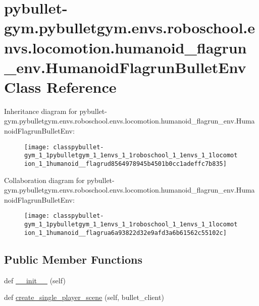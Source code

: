\hypertarget{classpybullet-gym_1_1pybulletgym_1_1envs_1_1roboschool_1_1envs_1_1locomotion_1_1humanoid__flagru3f2c7cfb3b7b479419ab25a1807bf084}{}\section{pybullet-\/gym.pybulletgym.\+envs.\+roboschool.\+envs.\+locomotion.\+humanoid\+\_\+flagrun\+\_\+env.\+Humanoid\+Flagrun\+Bullet\+Env Class Reference}
\label{classpybullet-gym_1_1pybulletgym_1_1envs_1_1roboschool_1_1envs_1_1locomotion_1_1humanoid__flagru3f2c7cfb3b7b479419ab25a1807bf084}


Inheritance diagram for pybullet-\/gym.pybulletgym.\+envs.\+roboschool.\+envs.\+locomotion.\+humanoid\+\_\+flagrun\+\_\+env.\+Humanoid\+Flagrun\+Bullet\+Env\+:
\nopagebreak
\begin{figure}[H]
\begin{center}
\leavevmode
\texttt{[image: classpybullet-gym\_1\_1pybulletgym\_1\_1envs\_1\_1roboschool\_1\_1envs\_1\_1locomotion\_1\_1humanoid\_\_flagrud8564978945b4501b0cc1adeffc7b835]}
\end{center}
\end{figure}


Collaboration diagram for pybullet-\/gym.pybulletgym.\+envs.\+roboschool.\+envs.\+locomotion.\+humanoid\+\_\+flagrun\+\_\+env.\+Humanoid\+Flagrun\+Bullet\+Env\+:
\nopagebreak
\begin{figure}[H]
\begin{center}
\leavevmode
\texttt{[image: classpybullet-gym\_1\_1pybulletgym\_1\_1envs\_1\_1roboschool\_1\_1envs\_1\_1locomotion\_1\_1humanoid\_\_flagrua6a93822d32e9afd3a6b61562c55102c]}
\end{center}
\end{figure}
\subsection*{Public Member Functions}
\begin{DoxyCompactItemize}
\item 
def \hyperlink{classpybullet-gym_1_1pybulletgym_1_1envs_1_1roboschool_1_1envs_1_1locomotion_1_1humanoid__flagru3f2c7cfb3b7b479419ab25a1807bf084_a628f035cb0d020500e821ba42b5a08ff}{\+\_\+\+\_\+init\+\_\+\+\_\+} (self)
\item 
def \hyperlink{classpybullet-gym_1_1pybulletgym_1_1envs_1_1roboschool_1_1envs_1_1locomotion_1_1humanoid__flagru3f2c7cfb3b7b479419ab25a1807bf084_a2ca350b2e55052350c8b6e513824e155}{create\+\_\+single\+\_\+player\+\_\+scene} (self, bullet\+\_\+client)
\end{DoxyCompactItemize}
